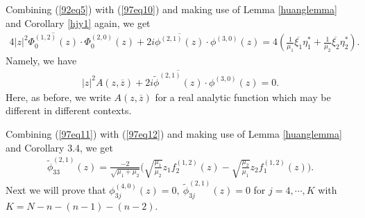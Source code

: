 \documentclass[12pt]{article}
\numberwithin{equation}{section}
\def\w{\widetilde}
\def\ov{\overline}
\begin{document}
Combining (\ref{92eq5}) with (\ref{97eq10}) and making use of Lemma
\ref{huanglemma}  and Corollary \ref{hjy1} again, we get
\begin{equation}\begin{split}
4|z|^2\ov{\Phi_0^{(1,2)}(z)}\cdot
\Phi_0^{(2,0)}(z)+2i\ov{\phi^{(2,1)}(z)}\cdot
\phi^{(3,0)}(z)=4(\frac{1}{\mu_1}\ov{\xi_1}\eta^*_1+\frac{1}{\mu_2}\ov{\xi_2}\eta^*_2).
\end{split}\end{equation}
Namely, we have
\begin{equation}\begin{split}\label{97eq12}
|z|^2A(z,\ov{z})+2i\ov{\w{\phi}^{(2,1)}(z)}\cdot \phi^{(3,0)}(z)=0.
\end{split}\end{equation}
Here, as before, we write $A(z,\ov{z})$ for a real analytic function
which may be different in different contexts.

 Combining (\ref{97eq11}) with (\ref{97eq12})  and making use of
 Lemma \ref{huanglemma} and Corollary 3.4, we  get
\begin{equation}\begin{split}\label{97eq14}
\w{\phi}_{33}^{(2,1)}(z)=\frac{-2}{\sqrt{\mu_1+\mu_2}}\Big(\sqrt{\frac{\mu_1}{\mu_2}}z_1f_2^{(1,2)}(z)
     -\sqrt{\frac{\mu_2}{\mu_1}}z_2f_1^{(1,2)}(z)\Big).
\end{split}\end{equation}
 Next we will prove that
$\phi_{3j}^{(4,0)}(z)=0,\ \w{\phi}_{3j}^{(2,1)}(z)=0$ for
$j=4,\cdots, K$ with $K=N-n-(n-1)-(n-2)$.

\medskip
\end{document}
